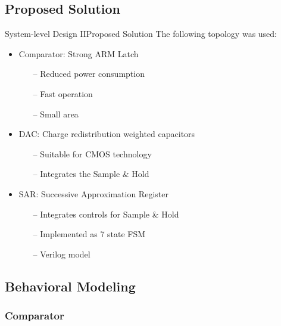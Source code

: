 \documentclass{beamer}
\begin{document}
 \subsection{Proposed Solution}
 \begin{frame}
  {System-level Design II}{Proposed Solution}
  The following topology was used:
  \vspace{1em}
  \begin{itemize}
   \item Comparator: \alert{Strong ARM Latch}
    \begin{itemize}
     \item[--] Reduced power consumption 
     \item[--] Fast operation
     \item[--] Small area
    \end{itemize}
   \item<2-> DAC: \alert{Charge redistribution weighted capacitors}
    \begin{itemize}
     \item[--] Suitable for CMOS technology
     \item[--] Integrates the Sample \& Hold
    \end{itemize}
   \item<3-> SAR: \alert{Successive Approximation Register}
    \begin{itemize}
     \item[--] Integrates controls for Sample \& Hold
     \item[--] Implemented as 7 state FSM
     \item[--] Verilog model
    \end{itemize}
  \end{itemize}
 \end{frame}
 \subsection{Behavioral Modeling}
 \subsubsection{Comparator}
\end{document}
